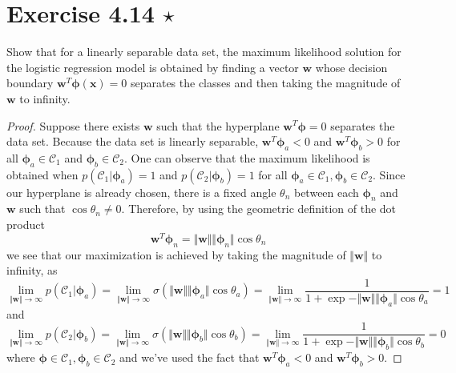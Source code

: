 \section*{Exercise 4.14 $\star$}
Show that for a linearly separable data set, the maximum likelihood
solution for the logistic regression model is obtained by finding a vector
$\mathbf{w}$ whose decision boundary $\mathbf{w}^T\bm{\phi}(\mathbf{x}) = 0$ 
separates the classes and then taking the magnitude of $\mathbf{w}$ to infinity.

\vspace{1em}

\begin{proof}
    Suppose there exists $\mathbf{w}$ such that the hyperplane 
    $\mathbf{w}^T\bm{\phi} = 0$ separates the data set.
    Because the data set is linearly separable, 
    $\mathbf{w}^T\bm{\phi}_a < 0$ and $\mathbf{w}^T\bm{\phi}_b > 0$
    for all $\bm{\phi}_a \in \mathcal{C}_1$ and $\bm{\phi}_b \in \mathcal{C}_2$.
    One can observe that the maximum likelihood is obtained
    when  $p(\mathcal{C}_1 | \bm{\phi}_a) = 1$ and $p(\mathcal{C}_2 | \bm{\phi}_b) = 1$ 
    for all $\bm{\phi}_a \in \mathcal{C}_1, \bm{\phi}_b \in \mathcal{C}_2$.
    Since our hyperplane is already chosen, there is a fixed angle $\theta_n$
    between each $\bm{\phi}_n$ and $\mathbf{w}$ such that $\cos \theta_n \neq 0$. Therefore,
    by using the geometric definition of the dot product
    \[
        \mathbf{w}^T\bm{\phi}_n
        = \Vert\mathbf{w}\Vert \Vert\bm{\phi}_n\Vert \cos \theta_n
    \] 
    we see that our maximization is achieved by taking the magnitude
    of $\Vert\mathbf{w}\Vert$ to infinity, as
    \[
        \lim_{\Vert\mathbf{w}\Vert \to \infty} p(\mathcal{C}_1 | \bm{\phi}_a)
        = \lim_{\Vert\mathbf{w}\Vert \to \infty} 
        \sigma(\Vert\mathbf{w}\Vert \Vert{\bm{\phi}_a}\Vert \cos \theta_a)
        = \lim_{\Vert\mathbf{w}\Vert \to \infty}
        \frac{1}{1 + \exp{-\Vert\mathbf{w}\Vert \Vert{\bm{\phi}_a}\Vert \cos \theta_a}} 
        = 1
    \] 
    and 
    \[
        \lim_{\Vert\mathbf{w}\Vert \to \infty} p(\mathcal{C}_2 | \bm{\phi}_b)
        = \lim_{\Vert\mathbf{w}\Vert \to \infty} 
        \sigma(\Vert\mathbf{w}\Vert \Vert{\bm{\phi}_b}\Vert \cos \theta_b)
        = \lim_{\Vert\mathbf{w}\Vert \to \infty}
        \frac{1}{1 + \exp{-\Vert\mathbf{w}\Vert \Vert{\bm{\phi}_b}\Vert \cos \theta_b}} 
        = 0
    \]
    where $\bm{\phi} \in \mathcal{C}_1, \bm{\phi}_b \in \mathcal{C}_2$ and we've used the
    fact that $\mathbf{w}^T\bm{\phi}_a < 0$ and $ \mathbf{w}^T\bm{\phi}_b > 0$.
\end{proof}

